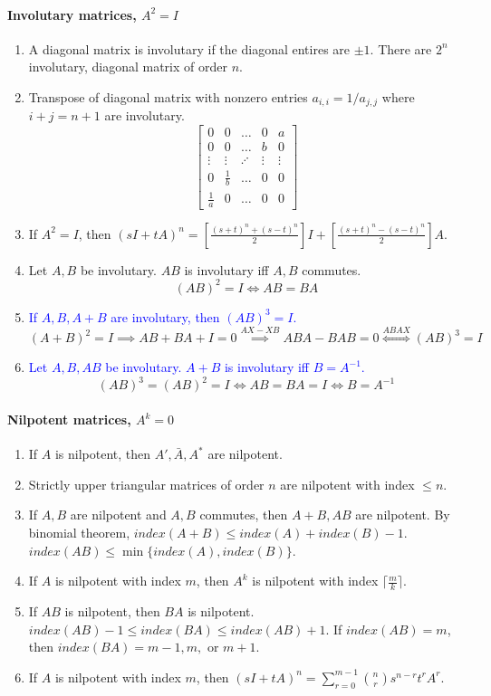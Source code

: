 \paragraph{Involutary matrices, $A^2=I$}
\begin{enumerate}
	\item A diagonal matrix is involutary if the diagonal entires are $\pm 1$.
		\subitem There are $2^n$ involutary, diagonal matrix of order $n$.
	\item Transpose of diagonal matrix with nonzero entries $a_{i,i} = 1/a_{j,j}$ where $i+j = n+1$ are involutary.
		$$\begin{bmatrix}0 & 0 & \dots & 0 & a \\ 0 & 0 & \dots & b & 0 \\ \vdots & \vdots & \iddots & \vdots & \vdots \\ 0 & \frac{1}{b} & \dots & 0 & 0 \\ \frac{1}{a} & 0 & \dots & 0 & 0 \end{bmatrix}$$
	\item If $A^2 = I$, then $(sI+tA)^n = \left[\frac{(s+t)^n+(s-t)^n}{2}\right]I + \left[\frac{(s+t)^n-(s-t)^n}{2}\right]A$.
	\item Let $A,B$ be involutary. $AB$ is involutary iff $A,B$ commutes.
		$$ (AB)^2 = I \iff AB = BA $$
	\item \textcolor{blue}{If $A,B,A+B$ are involutary, then $(AB)^3 = I$.}
		$$(A+B)^2 = I \implies AB+BA+I = 0 \overset{AX-XB}{\implies} ABA-BAB = 0 \overset{ABAX}{\iff} (AB)^3=I $$
	\item \textcolor{blue}{Let $A,B,AB$ be involutary. $A+B$ is involutary iff $B=A^{-1}$.}
		$$ (AB)^3 = (AB)^2 = I \iff AB = BA = I  \iff B = A^{-1} $$
\end{enumerate}

\paragraph{Nilpotent matrices, $A^k=0$}
\begin{enumerate}
	\item If $A$ is nilpotent, then $A',\bar{A},A^\ast$ are nilpotent.
	\item Strictly upper triangular matrices of order $n$ are nilpotent with index $\le n$.
	\item If $A,B$ are nilpotent and $A,B$ commutes, then $A+B,AB$ are nilpotent.
		\subitem By binomial theorem, $index(A+B) \le index(A) + index(B) -1$.
		\subitem $index(AB) \le \min\{ index(A),index(B) \}$.
	\item If $A$ is nilpotent with index $m$, then $A^k$ is nilpotent with index $\lceil \frac{m}{k} \rceil$.
	\item If $AB$ is nilpotent, then $BA$ is nilpotent.
		\subitem $index(AB)-1 \le index(BA) \le index(AB)+1$.
		\subitem If $index(AB) = m$, then $index(BA) = m-1,m, \text{ or } m+1$.
	\item If $A$ is nilpotent with index $m$, then $(sI+tA)^n = \sum_{r=0}^{m-1}\binom{n}{r} s^{n-r}t^rA^r$.
\end{enumerate}

